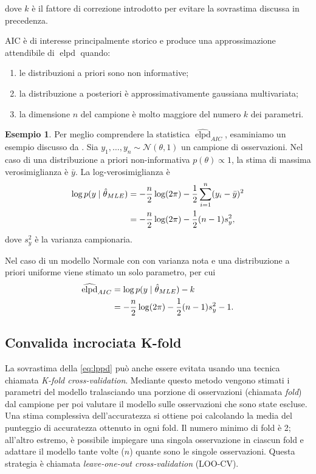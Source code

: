 \documentclass[
  10pt,
  italian,
  a4paper,
  extrafontsizes,onecolumn,openright
  ]{memoir}
\providecommand{\tightlist}{%
  \setlength{\itemsep}{0pt}\setlength{\parskip}{0pt}}
\DeclareMathOperator{\elpd}{elpd} %
\theoremstyle{definition}
\theoremstyle{definition}
\newtheorem{example}{Esempio}[chapter]
\theoremstyle{definition}
\theoremstyle{definition}
\theoremstyle{remark}
\begin{document}
\noindent
dove \(k\) è il fattore di correzione introdotto per evitare la sovrastima discussa in precedenza.

AIC è di interesse principalmente storico e produce una approssimazione attendibile di \(\elpd\) quando:

\begin{enumerate}
\def\labelenumi{\arabic{enumi}.}
\tightlist
\item
  le distribuzioni a priori sono non informative;
\item
  la distribuzione a posteriori è approssimativamente gaussiana multivariata;
\item
  la dimensione \(n\) del campione è molto maggiore del numero \(k\) dei parametri.
\end{enumerate}

\begin{example}

Per meglio comprendere la statistica \(\widehat{\elpd}_{AIC}\), esaminiamo un esempio discusso da \textcite{gelman2014understanding}. Sia \(y_1, \dots, y_n \sim \mathcal{N}(\theta, 1)\) un campione di osservazioni. Nel caso di una distribuzione a priori non-informativa \(p(\theta) \propto 1\), la stima di massima verosimiglianza è \(\bar{y}\). La log-verosimiglianza è
\begin{align}
\log p(y \mid \hat{\theta}_{MLE}) &= -\frac{n}{2} \log (2\pi) - \frac{1}{2}\sum_{i=1}^n (y_i - \bar{y})^2 \notag\\
&= -\frac{n}{2} \log (2\pi) - \frac{1}{2} (n-1)s_y^2,
\end{align}
\noindent
dove \(s_y^2\) è la varianza campionaria.

Nel caso di un modello Normale con con varianza nota e una distribuzione a priori uniforme viene stimato un solo parametro, per cui
\begin{align}
\widehat{\elpd}_{AIC} &= \log p(y \mid \hat{\theta}_{MLE}) - k \notag \\
&= -\frac{n}{2} \log (2\pi) - \frac{1}{2} (n-1)s_y^2 - 1.
\end{align}

\end{example}

\hypertarget{convalida-incrociata-k-fold}{%
\subsection{Convalida incrociata K-fold}\label{convalida-incrociata-k-fold}}

La sovrastima della \eqref{eq:lppd} può anche essere evitata usando una tecnica chiamata \emph{K-fold cross-validation}. Mediante questo metodo vengono stimati i parametri del modello tralasciando una porzione di osservazioni (chiamata \emph{fold}) dal campione per poi valutare il modello sulle osservazioni che sono state escluse. Una stima complessiva dell'accuratezza si ottiene poi calcolando la media del punteggio di accuratezza ottenuto in ogni fold. Il numero minimo di fold è 2; all'altro estremo, è possibile impiegare una singola osservazione in ciascun fold e adattare il modello tante volte (\(n\)) quante sono le singole osservazioni. Questa strategia è chiamata \emph{leave-one-out cross-validation} (LOO-CV).
\end{document}
